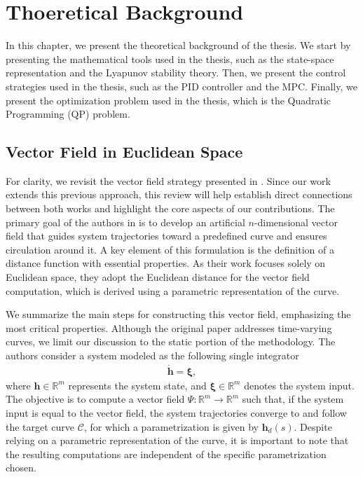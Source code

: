 \chapter{Thoeretical Background}\label{ch:background}
In this chapter, we present the theoretical background of the thesis. We start by presenting the mathematical tools used in the thesis, such as the state-space representation and the Lyapunov stability theory. Then, we present the control strategies used in the thesis, such as the PID controller and the MPC. Finally, we present the optimization problem used in the thesis, which is the Quadratic Programming (QP) problem. \citep{Rezende2022}

\section{Vector Field in Euclidean Space}\label{sec:adriano-review}
For clarity, we revisit the vector field strategy presented in \citet{Rezende2022}. Since our work extends this previous approach, this review will help establish direct connections between both works and highlight the core aspects of our contributions. The primary goal of the authors in \citet{Rezende2022} is to develop an artificial $n$-dimensional vector field that guides system trajectories toward a predefined curve and ensures circulation around it. A key element of this formulation is the definition of a distance function with essential properties. As their work focuses solely on Euclidean space, they adopt the Euclidean distance for the vector field computation, which is derived using a parametric representation of the curve.

We summarize the main steps for constructing this vector field, emphasizing the most critical properties. Although the original paper addresses time-varying curves, we limit our discussion to the static portion of the methodology. The authors consider a system modeled as the following single integrator 
\begin{align}
    \dot{\mathbf{h}} = \boldsymbol{\xi}, \label{eq:adriano-single-integrator}
\end{align}
where $\mathbf{h}\in\mathbb{R}^m$ represents the system state, and $\boldsymbol{\xi}\in\mathbb{R}^m$ denotes the system input. The objective is to compute a vector field $\Psi:\mathbb{R}^m\to\mathbb{R}^m$ such that, if the system input is equal to the vector field, the system trajectories converge to and follow the target curve $\mathcal{C}$, for which a parametrization is given by $\mathbf{h}_d(s)$. Despite relying on a parametric representation of the curve, it is important to note that the resulting computations are independent of the specific parametrization chosen.


